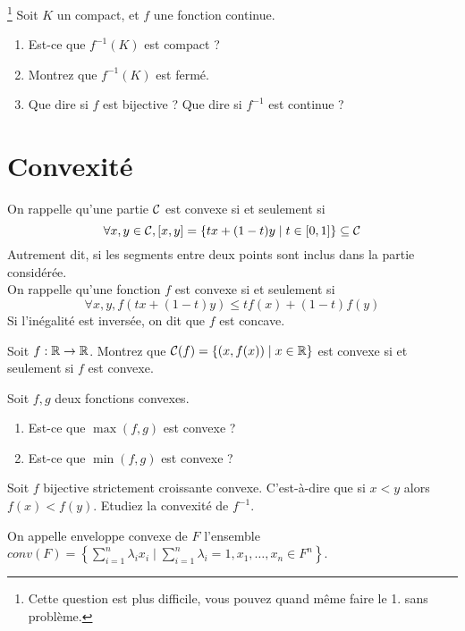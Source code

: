 \documentclass{cours}
\begin{document}
\begin{question}\footnote{Cette question est plus difficile, vous pouvez quand même faire le 1. sans problème.}
    Soit $K$ un compact, et $f$ une fonction continue. 
    \begin{enumerate}
        \item Est-ce que $f^{-1}(K)$ est compact ?
        \item Montrez que $f^{-1}(K)$ est fermé.
        \item Que dire si $f$ est bijective ? Que dire si $f^{-1}$ est continue ? 
    \end{enumerate}
\end{question}

\section{Convexité}
On rappelle qu'une partie $\mathcal{C}$ est convexe si et seulement si \[\forall x, y \in \mathcal{C}, \left[x, y\right] = \left\{tx + (1-t)y \mid t \in [0, 1]\right\} \subseteq \mathcal{C}\] Autrement dit, si les segments entre deux points sont inclus dans la partie considérée.\\
On rappelle qu'une fonction $f$ est convexe si et seulement si \[\forall x, y, f(tx + (1-t)y) \leq tf(x) + (1-t)f(y)\] Si l'inégalité est inversée, on dit que $f$ est concave.

\begin{question}
    Soit $f : \mathbb{R} \to \mathbb{R}$. Montrez que $\mathcal{C}(f) = \left\{\left(x, f(x)\right) \mid x \in \mathbb{R}\right\}$ est convexe si et seulement si $f$ est convexe.
\end{question}

\begin{question}
    Soit $f, g$ deux fonctions convexes.
    \begin{enumerate}
        \item Est-ce que $\max(f, g)$ est convexe ?
        \item Est-ce que $\min(f, g)$ est convexe ? 
    \end{enumerate}
\end{question}

\begin{question}
    Soit $f$ bijective strictement croissante convexe. C'est-à-dire que si $x < y$ alors $f(x) < f(y)$. Etudiez la convexité de $f^{-1}$.
\end{question}

On appelle enveloppe convexe de $F$ l'ensemble $conv(F) = \left\{\sum_{i = 1}^{n} \lambda_{i}x_{i} \mid \sum_{i = 1}^{n}\lambda_{i} = 1, x_{1}, \ldots, x_{n} \in F^{n}\right\}$.
\end{document}
